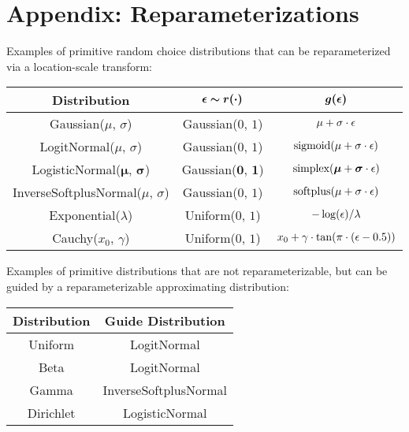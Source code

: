 \section{Appendix: Reparameterizations}
\label{sec:appendix_reparam}

Examples of primitive random choice distributions that can be reparameterized via a location-scale transform:

\begin{center}
\renewcommand{\arraystretch}{1.5}
\begin{tabular}{c | c | c}
\textbf{Distribution} & $\bm{\epsilon \sim r(\cdot)}$ & $\bm{g(\epsilon)}$ \\
\hline
Gaussian($\mu$, $\sigma$) & Gaussian($0$, $1$) & $\mu + \sigma \cdot \epsilon$ \\
LogitNormal($\mu$, $\sigma$) & Gaussian($0$, $1$) & $\text{sigmoid}(\mu + \sigma \cdot \epsilon)$ \\
LogisticNormal($\bm{\mu}$, $\bm{\sigma}$) & Gaussian($\bm{0}$, $\bm{1}$) & $\text{simplex}(\bm{\mu} + \bm{\sigma} \cdot \epsilon)$ \\
InverseSoftplusNormal($\mu$, $\sigma$) & Gaussian($0$, $1$) & $\text{softplus}(\mu + \sigma \cdot \epsilon)$ \\
Exponential($\lambda$) & Uniform($0$, $1$) & $-\log(\epsilon) / \lambda$ \\
Cauchy($x_0$, $\gamma$) & Uniform($0$, $1$) & $x_0 + \gamma \cdot \tan( \pi \cdot (\epsilon - 0.5) )$
\end{tabular}
\end{center}

Examples of primitive distributions that are not reparameterizable, but can be guided by a reparameterizable approximating distribution:

\begin{center}
\renewcommand{\arraystretch}{1.5}
\begin{tabular}{c | c}
\textbf{Distribution} & \textbf{Guide Distribution} \\
\hline
Uniform & LogitNormal \\
Beta & LogitNormal \\
Gamma & InverseSoftplusNormal \\
Dirichlet & LogisticNormal
\end{tabular}
\end{center}


